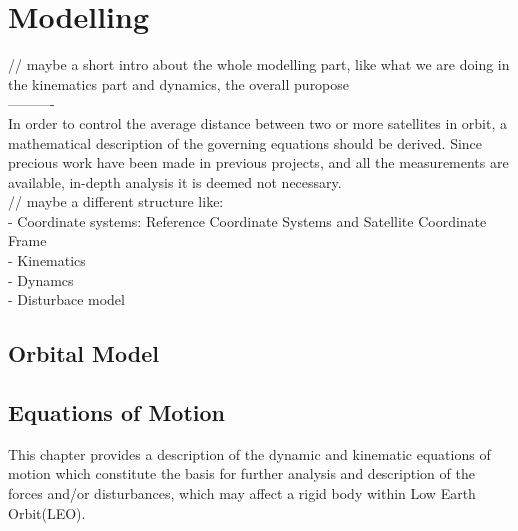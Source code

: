 \chapter{Modelling}
// maybe a short intro about the whole modelling part, like what we are doing in the kinematics part and dynamics, the overall puropose \\
----------\\
In order to control the average distance between two or more satellites in orbit, a mathematical description of the governing equations should be derived. Since precious work have been made in previous projects, and all the measurements are available, in-depth analysis it is deemed not necessary. \\

// maybe a different structure like:\\
- Coordinate systems: Reference Coordinate Systems and Satellite Coordinate Frame\\
- Kinematics \\
- Dynamcs \\
- Disturbace model 
\section{Orbital Model}
%
\section{Equations of Motion}
%
This chapter provides a description of the dynamic and kinematic equations of motion which constitute the basis for further analysis and description of the forces and/or disturbances, which may affect a rigid body within  Low Earth Orbit(LEO).
%
